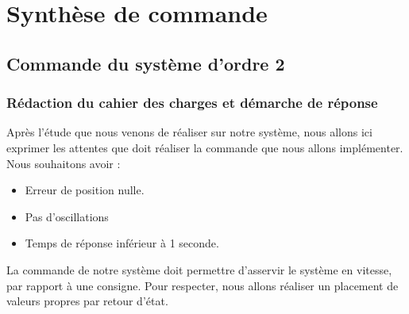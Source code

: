 \chapter{Synthèse de commande}
\label{chap:commande}
\section{Commande du système d'ordre 2}
\subsection{Rédaction du cahier des charges et démarche de réponse}
Après l'étude que nous venons de réaliser sur notre système, nous allons ici exprimer les attentes que doit réaliser la commande que nous allons implémenter. Nous souhaitons avoir : \begin{itemize} 
\item Erreur de position nulle.
\item Pas d'oscillations
\item Temps de réponse inférieur à 1 seconde.
\end{itemize}
La commande de notre système doit permettre d'asservir le système en vitesse, par rapport à une consigne. Pour respecter, nous allons réaliser un placement de valeurs propres par retour d'état.



